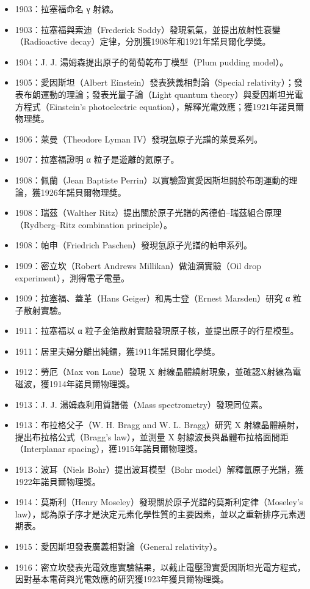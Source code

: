 \documentclass[a4paper,12pt]{article}
\begin{document}
\begin{itemize}
\item 1903：拉塞福命名 γ 射線。
\item 1903：拉塞福與索迪（Frederick Soddy）發現氡氣，並提出放射性衰變（Radioactive decay）定律，分別獲1908年和1921年諾貝爾化學獎。
\item 1904：J. J. 湯姆森提出原子的葡萄乾布丁模型（Plum pudding model）。
\item 1905：愛因斯坦（Albert Einstein）發表狹義相對論（Special relativity）；發表布朗運動的理論；發表光量子論（Light quantum theory）與愛因斯坦光電方程式（Einstein's photoelectric equation），解釋光電效應；獲1921年諾貝爾物理獎。
\item 1906：萊曼（Theodore Lyman IV）發現氫原子光譜的萊曼系列。
\item 1907：拉塞福證明 α 粒子是遊離的氦原子。
\item 1908：佩蘭（Jean Baptiste Perrin）以實驗證實愛因斯坦關於布朗運動的理論，獲1926年諾貝爾物理獎。
\item 1908：瑞茲（Walther Ritz）提出關於原子光譜的芮德伯–瑞茲組合原理（Rydberg–Ritz combination principle）。
\item 1908：帕申（Friedrich Paschen）發現氫原子光譜的帕申系列。
\item 1909：密立坎（Robert Andrews Millikan）做油滴實驗（Oil drop experiment），測得電子電量。
\item 1909：拉塞福、蓋革（Hans Geiger）和馬士登（Ernest Marsden）研究 α 粒子散射實驗。
\item 1911：拉塞福以 α 粒子金箔散射實驗發現原子核，並提出原子的行星模型。
\item 1911：居里夫婦分離出純鐳，獲1911年諾貝爾化學獎。
\item 1912：勞厄（Max von Laue）發現 X 射線晶體繞射現象，並確認X射線為電磁波，獲1914年諾貝爾物理獎。
\item 1913：J. J. 湯姆森利用質譜儀（Mass spectrometry）發現同位素。
\item 1913：布拉格父子（W. H. Bragg and W. L. Bragg）研究 X 射線晶體繞射，提出布拉格公式（Bragg's law），並測量 X 射線波長與晶體布拉格面間距（Interplanar spacing），獲1915年諾貝爾物理獎。
\item 1913：波耳（Niels Bohr）提出波耳模型（Bohr model）解釋氫原子光譜，獲1922年諾貝爾物理獎。
\item 1914：莫斯利（Henry Moseley）發現關於原子光譜的莫斯利定律（Moseley's law），認為原子序才是決定元素化學性質的主要因素，並以之重新排序元素週期表。
\item 1915：愛因斯坦發表廣義相對論（General relativity）。
\item 1916：密立坎發表光電效應實驗結果，以截止電壓證實愛因斯坦光電方程式，因對基本電荷與光電效應的研究獲1923年獲貝爾物理獎。

\end{itemize}
\end{document}
